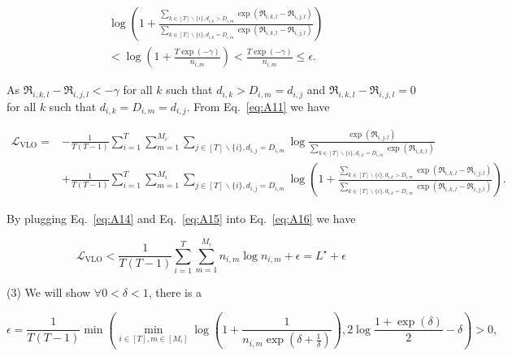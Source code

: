 \begin{equation} \label{eq:A15}
\begin{array}{rl} 
& \log \left(1+\frac{\sum\limits_{k \in[T] \backslash\{i\}, d_{i, k}>D_{i, m}} \exp \left(\mathfrak{R}_{i, k,l}-\mathfrak{R}_{i, j,l}\right)}{\sum\limits_{k \in[T] \backslash \{i\}, d_{i, k}=D_{i, m}} \exp \left(\mathfrak{R}_{i, k,l}-\mathfrak{R}_{i, j,l}\right)}\right)
\\ & < \log \left(1 + \frac{T \exp(-\gamma)}{n_{i,m}}\right) < \frac{T \exp(-\gamma)}{n_{i,m}} \leq \epsilon.
\end{array}
\end{equation}


As $\mathfrak{R}_{i, k,l}-\mathfrak{R}_{i, j,l}<-\gamma$ for all $k$ such that $d_{i, k}>D_{i, m}=d_{i, j}$ and $\mathfrak{R}_{i, k,l}-\mathfrak{R}_{i, j,l}=0$ for all $k$ such that $d_{i, k}=D_{i, m}=d_{i, j}$.
From Eq.~\eqref{eq:A11} we have

\begin{equation} \label{eq:A16}
\begin{aligned}
\mathcal{L}_{\mathrm{VLO}}= &-\frac{1}{T(T-1)} \sum\limits_{i=1}^{T} \sum\limits_{m=1}^{M_i} \sum\limits_{j \in [T] \backslash\{i\}, d_{i, j}=D_{i, m}} \log \frac{\exp \left(\mathfrak{R}_{i, j,l}\right)}{\sum\limits_{k \in[T] \backslash\{i \}, d_{i, k}=D_{i, m}} \exp \left(\mathfrak{R}_{i, k,l}\right)} \\
& +\frac{1}{T(T-1)} \sum\limits_{i=1}^{T} \sum\limits_{m=1}^{M_i} \sum\limits_{j \in[T] \backslash\{i\}, d_{i, j}=D_{i, m}} \log \left(1+\frac{\sum\limits_{k \in[T] \backslash\{i\}, d_{i, k}>D_{i, m}} \exp \left(\mathfrak{R}_{i, k,l}-\mathfrak{R}_{i, j,l}\right)}{\sum\limits_{k \in[T] \backslash\{i\}, d_{i, k}=D_{i, m}} \exp \left(\mathfrak{R}_{i, k,l}-\mathfrak{R}_{i, j,l}\right)}\right).
\end{aligned}
\end{equation}


By plugging Eq.~\eqref{eq:A14} and Eq.~\eqref{eq:A15} into Eq.~\eqref{eq:A16} we have

\begin{equation} \label{eq:A17}
\mathcal{L}_{\mathrm{VLO}}<\frac{1}{T(T-1)} \sum\limits_{i=1}^{T} \sum\limits_{m=1}^{M_i} n_{i, m} \log n_{i, m}+\epsilon=L^{\star}+\epsilon
\end{equation}


(3) We will show $\forall 0< \delta < 1$, there is a

$$
\epsilon=\frac{1}{T(T-1)} \min \left(\min _{i \in[T], m \in\left[M_i\right]} \log \left(1+\frac{1}{n_{i, m} \exp \left(\delta+\frac{1}{\delta}\right)}\right), 2 \log \frac{1+\exp (\delta)}{2}-\delta\right)>0,
$$

